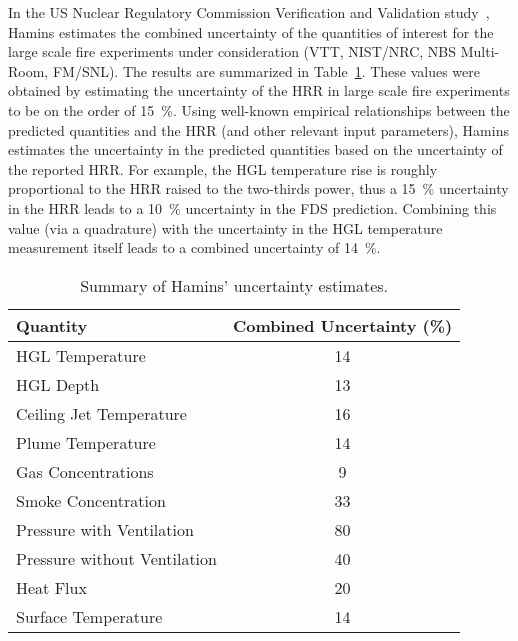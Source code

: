 In the US Nuclear Regulatory Commission Verification and Validation study~\cite{NUREG_1824}, Hamins estimates the combined
uncertainty of the quantities of interest for the large scale fire experiments under consideration (VTT, NIST/NRC, NBS Multi-Room, FM/SNL). The
results are summarized in Table~\ref{Uncertainty}. These values were obtained by estimating the uncertainty of the HRR in large scale fire
experiments to be on the order of 15~\%. Using well-known empirical relationships between the predicted quantities and the HRR (and other relevant
input parameters), Hamins
estimates the uncertainty in the predicted quantities based on the uncertainty of the reported HRR. For example, the HGL temperature rise is roughly
proportional to the HRR raised to the two-thirds power, thus a 15~\% uncertainty in the HRR leads to a 10~\% uncertainty in the FDS prediction.
Combining this value (via a quadrature) with the uncertainty in the HGL temperature measurement itself leads to a combined uncertainty of
14~\%.

\begin{table}[ht!]
\caption{Summary of Hamins' uncertainty estimates. }
\begin{center}
\begin{tabular}{|l|c|}
\hline
Quantity                    & Combined Uncertainty (\%)       \\ \hline \hline
HGL Temperature             & 14    \\ \hline
HGL Depth                   & 13    \\ \hline
Ceiling Jet Temperature     & 16    \\ \hline
Plume Temperature           & 14    \\ \hline
Gas Concentrations          & 9     \\ \hline
Smoke Concentration         & 33    \\ \hline
Pressure with Ventilation   & 80    \\ \hline
Pressure without Ventilation   & 40    \\ \hline
Heat Flux                   & 20    \\ \hline
Surface Temperature         & 14    \\ \hline
\end{tabular}
\end{center}
\label{Uncertainty}
\end{table}



